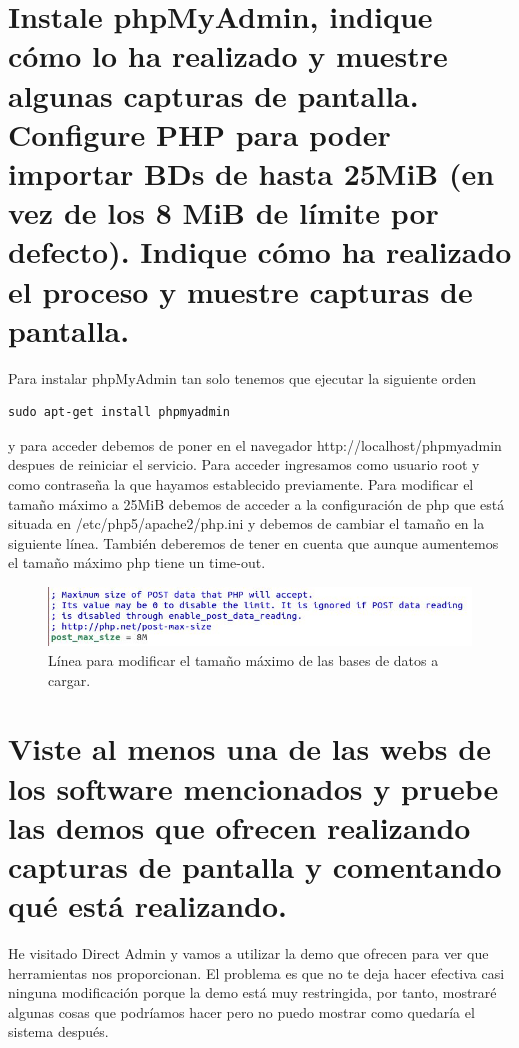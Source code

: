 \section{Instale phpMyAdmin, indique cómo lo ha realizado y muestre algunas capturas de pantalla. Configure PHP para poder importar BDs de hasta 25MiB (en vez de los 8 MiB de límite por defecto). Indique cómo ha realizado el proceso y muestre capturas de pantalla.}
Para instalar phpMyAdmin\cite{phpmyadmin} tan solo tenemos que ejecutar la siguiente orden \begin{verbatim}sudo apt-get install phpmyadmin\end{verbatim} y para acceder debemos de poner en el navegador http://localhost/phpmyadmin despues de reiniciar el servicio. Para acceder ingresamos como usuario root y como contraseña la que hayamos establecido previamente.\newline
Para modificar el tamaño máximo a 25MiB debemos de acceder a la configuración de php que está situada en /etc/php5/apache2/php.ini y debemos de cambiar el tamaño en la siguiente línea. También deberemos de tener en cuenta que aunque aumentemos el tamaño máximo php tiene un time-out.
\begin{figure}[H]
	\centering
	\includegraphics[scale=0.75]{php-max-size.jpg}
	\caption{Línea para modificar el tamaño máximo de las bases de datos a cargar. \label{fig:figura30}}
\end{figure}

\section{Viste al menos una de las webs de los software mencionados	y pruebe las demos que ofrecen realizando capturas de pantalla y comentando qué está realizando.}

He visitado Direct Admin \cite{direct-admin} y vamos a utilizar la demo que ofrecen para ver que herramientas nos proporcionan. El problema es que no te deja hacer efectiva casi ninguna modificación porque la demo está muy restringida, por tanto, mostraré algunas cosas que podríamos hacer pero no puedo mostrar como quedaría el sistema después.

